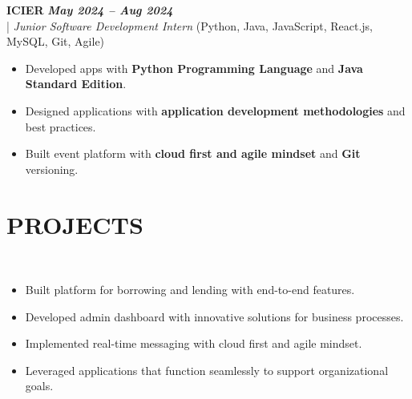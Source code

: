 \documentclass[10pt,a4paper]{article}
\begin{document}
\vspace{5pt}
\noindent
   \textbf{ICIER} \hfill \textit{\textbf{May 2024 -- Aug 2024}} \\
  \;|\;
  \textit{Junior Software Development Intern} (Python, Java, JavaScript, React.js, MySQL, Git, Agile)
  \hfill

\begin{itemize}



\item Developed apps with \textbf{Python Programming Language} and \textbf{Java Standard Edition}.



\item Designed applications with \textbf{application development methodologies} and best practices.



\item Built event platform with \textbf{cloud first and agile mindset} and \textbf{Git} versioning.



\end{itemize}
\section*{PROJECTS}
\small

\noindent
{}\\[-12pt]
\begin{itemize}

\item Built platform for borrowing and lending with end-to-end features.

\item Developed admin dashboard with innovative solutions for business processes.

\item Implemented real-time messaging with cloud first and agile mindset.

\item Leveraged applications that function seamlessly to support organizational goals.

\end{itemize}
\end{document}
